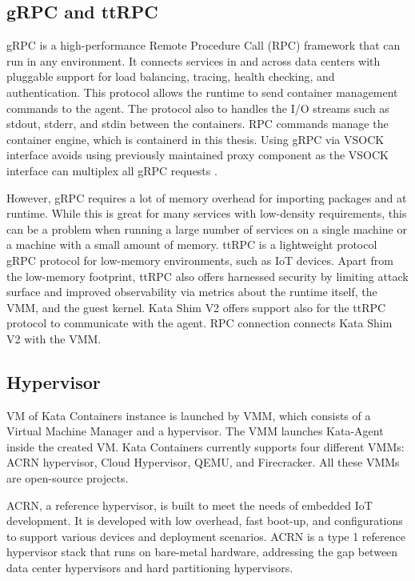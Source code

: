 \subsection{gRPC and ttRPC}

gRPC is a high-performance Remote Procedure Call (RPC) framework that can run in any environment. It connects services in and across data centers with pluggable support for load balancing, tracing, health checking, and authentication. This protocol allows the runtime to send container management commands to the agent. The protocol also to handles the I/O streams such as stdout, stderr, and stdin between the containers. RPC commands manage the container engine, which is containerd in this thesis. Using gRPC via VSOCK interface avoids using previously maintained proxy component as the VSOCK interface can multiplex all gRPC requests \cite{Randazzo2019}. \cite{gRPC}\cite{KataContainersArchitecture}

However, gRPC requires a lot of memory overhead for importing packages and at runtime. While this is great for many services with low-density requirements, this can be a problem when running a large number of services on a single machine or a machine with a small amount of memory. ttRPC is a lightweight protocol gRPC protocol for low-memory environments, such as IoT devices. Apart from the low-memory footprint, ttRPC also offers harnessed security by limiting attack surface and improved observability via metrics about the runtime itself, the VMM, and the guest kernel. Kata Shim V2 offers support also for the ttRPC protocol to communicate with the agent. RPC connection connects Kata Shim V2 with the VMM. \cite{ttRPC}

\subsection{Hypervisor}
\label{subsection:Hypervisor}

VM of Kata Containers instance is launched by VMM, which consists of a Virtual Machine Manager and a hypervisor. The VMM launches Kata-Agent inside the created VM. Kata Containers currently supports four different VMMs: ACRN hypervisor, Cloud Hypervisor, QEMU, and Firecracker. All these VMMs are open-source projects.

ACRN, a reference hypervisor, is built to meet the needs of embedded IoT development. It is developed with low overhead, fast boot-up, and configurations to support various devices and deployment scenarios. ACRN is a type 1 reference hypervisor stack that runs on bare-metal hardware, addressing the gap between data center hypervisors and hard partitioning hypervisors. \cite{ACRN}

